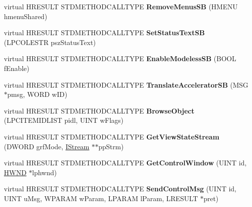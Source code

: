 \begin{DoxyCompactItemize}
\item 
\mbox{\label{class_c_shell_browser_ae1d36c17ac3c2c3d4e5950472cfc2d67}} 
virtual H\+R\+E\+S\+U\+LT S\+T\+D\+M\+E\+T\+H\+O\+D\+C\+A\+L\+L\+T\+Y\+PE {\bfseries Remove\+Menus\+SB} (H\+M\+E\+NU hmenu\+Shared)
\item 
\mbox{\label{class_c_shell_browser_ab05d036b48ed4ef40d007aacf861e4f7}} 
virtual H\+R\+E\+S\+U\+LT S\+T\+D\+M\+E\+T\+H\+O\+D\+C\+A\+L\+L\+T\+Y\+PE {\bfseries Set\+Status\+Text\+SB} (L\+P\+C\+O\+L\+E\+S\+TR psz\+Status\+Text)
\item 
\mbox{\label{class_c_shell_browser_a603a5b85ac435593b2447e2089194c50}} 
virtual H\+R\+E\+S\+U\+LT S\+T\+D\+M\+E\+T\+H\+O\+D\+C\+A\+L\+L\+T\+Y\+PE {\bfseries Enable\+Modeless\+SB} (B\+O\+OL f\+Enable)
\item 
\mbox{\label{class_c_shell_browser_a14cf01fa6c7654ab767b9c295936e017}} 
virtual H\+R\+E\+S\+U\+LT S\+T\+D\+M\+E\+T\+H\+O\+D\+C\+A\+L\+L\+T\+Y\+PE {\bfseries Translate\+Accelerator\+SB} (M\+SG $\ast$pmsg, W\+O\+RD w\+ID)
\item 
\mbox{\label{class_c_shell_browser_a8e61469cd942f57d0a714f3c2206fa8c}} 
virtual H\+R\+E\+S\+U\+LT S\+T\+D\+M\+E\+T\+H\+O\+D\+C\+A\+L\+L\+T\+Y\+PE {\bfseries Browse\+Object} (L\+P\+C\+I\+T\+E\+M\+I\+D\+L\+I\+ST pidl, U\+I\+NT w\+Flags)
\item 
\mbox{\label{class_c_shell_browser_a1c8c3e4bbb20cb5efddc5149baeccc80}} 
virtual H\+R\+E\+S\+U\+LT S\+T\+D\+M\+E\+T\+H\+O\+D\+C\+A\+L\+L\+T\+Y\+PE {\bfseries Get\+View\+State\+Stream} (D\+W\+O\+RD grf\+Mode, \hyperlink{interface_i_stream}{I\+Stream} $\ast$$\ast$pp\+Strm)
\item 
\mbox{\label{class_c_shell_browser_a8b701c52ad7a276d3755b1db48bfeaeb}} 
virtual H\+R\+E\+S\+U\+LT S\+T\+D\+M\+E\+T\+H\+O\+D\+C\+A\+L\+L\+T\+Y\+PE {\bfseries Get\+Control\+Window} (U\+I\+NT id, \hyperlink{interfacevoid}{H\+W\+ND} $\ast$lphwnd)
\item 
\mbox{\label{class_c_shell_browser_a97b314a348c2a1e69a0d2c3acd1bca19}} 
virtual H\+R\+E\+S\+U\+LT S\+T\+D\+M\+E\+T\+H\+O\+D\+C\+A\+L\+L\+T\+Y\+PE {\bfseries Send\+Control\+Msg} (U\+I\+NT id, U\+I\+NT u\+Msg, W\+P\+A\+R\+AM w\+Param, L\+P\+A\+R\+AM l\+Param, L\+R\+E\+S\+U\+LT $\ast$pret)
$$
\end{DoxyCompactItemize}
